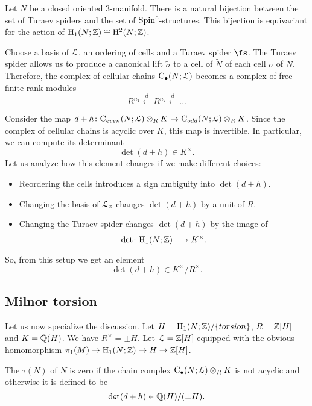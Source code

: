 \begin{prop}[Turaev]
	Let $N$ be a closed oriented 3-manifold. There is a natural bijection between the set of Turaev spiders and the set of $\mathrm{Spin}^c$-structures. This bijection is equivariant for the action of $\mathrm{H}_1(N; \mathbb{Z})\cong\mathrm{H}^2(N; \mathbb{Z})$.
\end{prop}

Choose a basis of $\mathcal{L}$, an ordering of cells and a Turaev spider $\fs$. The Turaev spider allows us to produce a canonical lift $\tilde{\sigma}$ to a cell of $\tilde{N}$ of each cell $\sigma$ of $N$. Therefore, the complex of cellular chains $\mathrm{C}_\bullet(N; \mathcal{L})$ becomes a complex of free finite rank modules
\[R^{n_1}\xleftarrow{d} R^{n_2}\xleftarrow{d} \dots\]

Consider the map $d+h\colon \mathrm{C}_{even}(N; \mathcal{L})\otimes_R K\rightarrow \mathrm{C}_{odd}(N; \mathcal{L})\otimes_R K$. Since the complex of cellular chains is acyclic over $K$, this map is invertible. In particular, we can compute its determinant
\[\det(d + h)\in K^\times.\]
Let us analyze how this element changes if we make different choices:
\begin{itemize}
	\item Reordering the cells introduces a sign ambiguity into $\det(d + h)$.
	
	\item Changing the basis of $\mathcal{L}_x$ changes $\det(d+h)$ by a unit of $R$.
	
	\item Changing the Turaev spider changes $\det(d+h)$ by the image of
	\[\det\colon \mathrm{H}_1(N; \mathbb{Z})\longrightarrow K^\times.\]
\end{itemize}

So, from this setup we get an element
\[\det(d + h)\in K^\times / R^\times.\]

\subsection{Milnor torsion}

Let us now specialize the discussion. Let $H=\mathrm{H}_1(N; \mathbb{Z})/\{torsion\}$, $R=\mathbb{Z}[H]$ and $K = \mathbb{Q}(H)$. We have $R^\times = \pm H$. Let $\mathcal{L} = \mathbb{Z}[H]$ equipped with the obvious homomorphism $\pi_1(M)\rightarrow \mathrm{H}_1(N; \mathbb{Z})
\rightarrow H\rightarrow \mathbb{Z}[H]$.

\begin{defn}
	The  $\tau(N)$ of $N$ is zero if the chain complex $\mathrm{C}_\bullet(N; \mathcal{L})\otimes_R K$ is not acyclic and otherwise it is defined to be
	\[\det(d + h)\in \mathbb{Q}(H) / (\pm H).\]
\end{defn}

